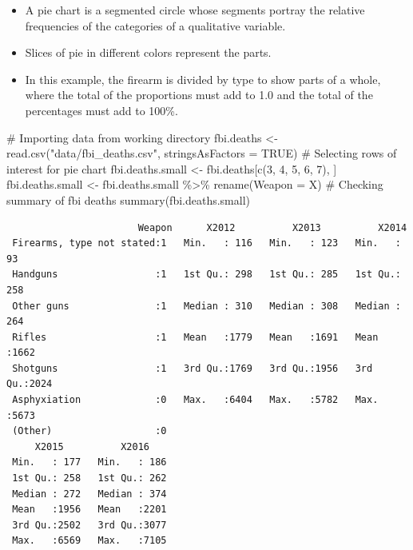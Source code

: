 \documentclass[
  letterpaper,
  DIV=11,
  numbers=noendperiod]{scrreprt}
\newenvironment{Shaded}{\begin{snugshade}}{\end{snugshade}}
\newcommand{\AttributeTok}[1]{\textcolor[rgb]{0.40,0.45,0.13}{#1}}
\newcommand{\CommentTok}[1]{\textcolor[rgb]{0.37,0.37,0.37}{#1}}
\newcommand{\ConstantTok}[1]{\textcolor[rgb]{0.56,0.35,0.01}{#1}}
\newcommand{\DecValTok}[1]{\textcolor[rgb]{0.68,0.00,0.00}{#1}}
\newcommand{\FunctionTok}[1]{\textcolor[rgb]{0.28,0.35,0.67}{#1}}
\newcommand{\NormalTok}[1]{\textcolor[rgb]{0.00,0.23,0.31}{#1}}
\newcommand{\OtherTok}[1]{\textcolor[rgb]{0.00,0.23,0.31}{#1}}
\newcommand{\SpecialCharTok}[1]{\textcolor[rgb]{0.37,0.37,0.37}{#1}}
\newcommand{\StringTok}[1]{\textcolor[rgb]{0.13,0.47,0.30}{#1}}
\providecommand{\tightlist}{%
  \setlength{\itemsep}{0pt}\setlength{\parskip}{0pt}}\usepackage{longtable,booktabs,array}
\begin{document}
\begin{itemize}
\tightlist
\item
  A pie chart is a segmented circle whose segments portray the relative
  frequencies of the categories of a qualitative variable.
\item
  Slices of pie in different colors represent the parts.
\item
  In this example, the firearm is divided by type to show parts of a
  whole, where the total of the proportions must add to 1.0 and the
  total of the percentages must add to 100\%.
\end{itemize}

\begin{Shaded}
\begin{Highlighting}[]
\CommentTok{\# Importing data from working directory}
\NormalTok{fbi.deaths }\OtherTok{\textless{}{-}} \FunctionTok{read.csv}\NormalTok{(}\StringTok{"data/fbi\_deaths.csv"}\NormalTok{, }\AttributeTok{stringsAsFactors =} \ConstantTok{TRUE}\NormalTok{)}
\CommentTok{\# Selecting rows of interest for pie chart}
\NormalTok{fbi.deaths.small }\OtherTok{\textless{}{-}}\NormalTok{ fbi.deaths[}\FunctionTok{c}\NormalTok{(}\DecValTok{3}\NormalTok{, }\DecValTok{4}\NormalTok{, }\DecValTok{5}\NormalTok{, }\DecValTok{6}\NormalTok{, }\DecValTok{7}\NormalTok{), ]}
\NormalTok{fbi.deaths.small }\OtherTok{\textless{}{-}}\NormalTok{ fbi.deaths.small }\SpecialCharTok{\%\textgreater{}\%}
    \FunctionTok{rename}\NormalTok{(}\AttributeTok{Weapon =}\NormalTok{ X)}
\CommentTok{\# Checking summary of fbi deaths}
\FunctionTok{summary}\NormalTok{(fbi.deaths.small)}
\end{Highlighting}
\end{Shaded}

\begin{verbatim}
                       Weapon      X2012          X2013          X2014     
 Firearms, type not stated:1   Min.   : 116   Min.   : 123   Min.   :  93  
 Handguns                 :1   1st Qu.: 298   1st Qu.: 285   1st Qu.: 258  
 Other guns               :1   Median : 310   Median : 308   Median : 264  
 Rifles                   :1   Mean   :1779   Mean   :1691   Mean   :1662  
 Shotguns                 :1   3rd Qu.:1769   3rd Qu.:1956   3rd Qu.:2024  
 Asphyxiation             :0   Max.   :6404   Max.   :5782   Max.   :5673  
 (Other)                  :0                                               
     X2015          X2016     
 Min.   : 177   Min.   : 186  
 1st Qu.: 258   1st Qu.: 262  
 Median : 272   Median : 374  
 Mean   :1956   Mean   :2201  
 3rd Qu.:2502   3rd Qu.:3077  
 Max.   :6569   Max.   :7105  
                              
\end{verbatim}
\end{document}
